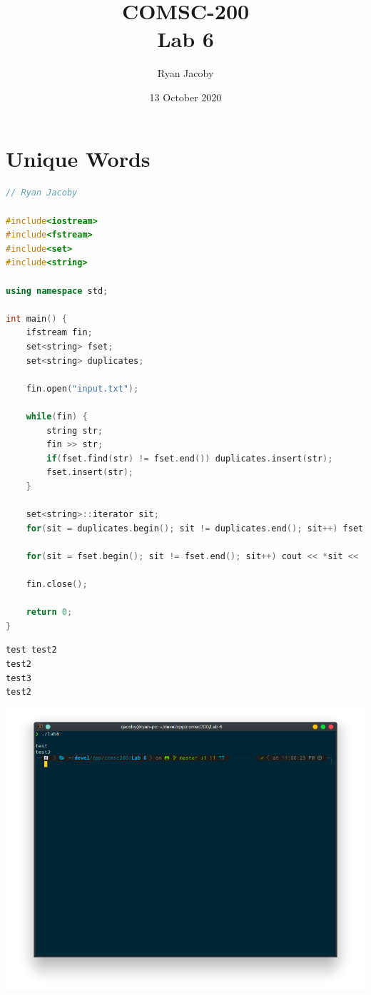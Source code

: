 \documentclass[letterpaper, 11pt]{article}
\title{COMSC-200 \\ Lab 6}
\author{Ryan Jacoby}
\date{13 October 2020}
\begin{document}
\maketitle

\section{Unique Words}

\begin{lstlisting}[language=c++, caption=main.cpp]
// Ryan Jacoby

#include<iostream>
#include<fstream>
#include<set>
#include<string>

using namespace std;

int main() {
    ifstream fin;
    set<string> fset;
    set<string> duplicates;

    fin.open("input.txt");

    while(fin) {
        string str;
        fin >> str;
        if(fset.find(str) != fset.end()) duplicates.insert(str);
        fset.insert(str);
    }

    set<string>::iterator sit;
    for(sit = duplicates.begin(); sit != duplicates.end(); sit++) fset.erase(*sit);

    for(sit = fset.begin(); sit != fset.end(); sit++) cout << *sit << '\n';

    fin.close();

    return 0;
}
\end{lstlisting}

\begin{lstlisting}[caption=input.txt]
test test2
test2
test3
test2
\end{lstlisting}

\includegraphics[scale=0.5]{unique.png}
\end{document}
